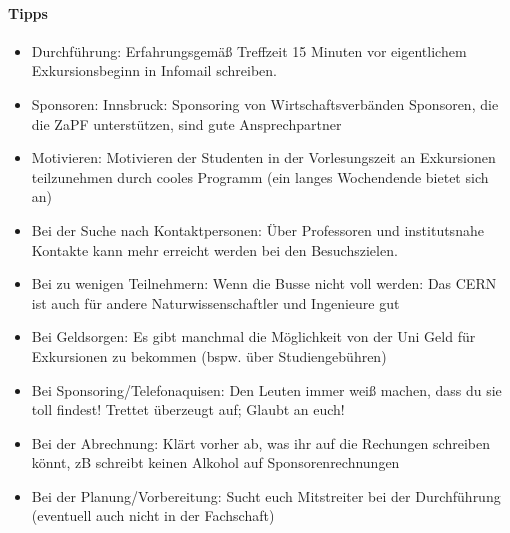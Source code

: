     \paragraph{Tipps}
      \begin{itemize}
        \item Durchführung:
        Erfahrungsgemäß Treffzeit 15 Minuten vor eigentlichem Exkursionsbeginn in Infomail schreiben.
        \item Sponsoren:
        Innsbruck: Sponsoring von Wirtschaftsverbänden
        Sponsoren, die die ZaPF unterstützen, sind gute Ansprechpartner
        \item Motivieren:
        Motivieren der Studenten in der Vorlesungszeit an Exkursionen teilzunehmen durch cooles Programm (ein langes Wochendende bietet sich an)
        \item Bei der Suche nach Kontaktpersonen:
        Über Professoren und institutsnahe Kontakte kann mehr erreicht werden bei den Besuchszielen.
        \item Bei zu wenigen Teilnehmern:
        Wenn die Busse nicht voll werden: Das CERN ist auch für andere Naturwissenschaftler und Ingenieure gut
        \item Bei Geldsorgen:
        Es gibt manchmal die Möglichkeit von der Uni Geld für Exkursionen zu bekommen (bspw. über Studiengebühren)
        \item Bei Sponsoring/Telefonaquisen:
        Den Leuten immer weiß machen, dass du sie toll findest! Trettet überzeugt auf; Glaubt an euch!
        \item Bei der Abrechnung:
        Klärt vorher ab, was ihr auf die Rechungen schreiben könnt, zB schreibt keinen Alkohol auf Sponsorenrechnungen
        \item Bei der Planung/Vorbereitung:
        Sucht euch Mitstreiter bei der Durchführung (eventuell auch nicht in der Fachschaft)
      \end{itemize}

